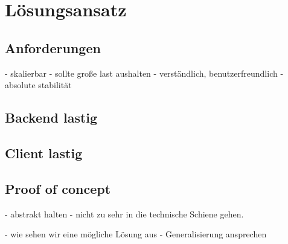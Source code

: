\chapter{Lösungsansatz}

\section{Anforderungen}

- skalierbar
- sollte große last aushalten
- verständlich, benutzerfreundlich
- absolute stabilität 


\section{Backend lastig}

\section{Client lastig}

\section{Proof of concept}


- abstrakt halten
- nicht zu sehr in die technische Schiene gehen. 

- wie sehen wir eine mögliche Lösung aus
- Generalisierung ansprechen